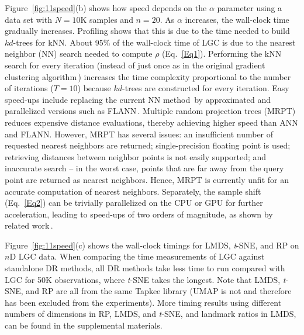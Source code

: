 \documentclass[sagev,Afour,times]{sagej}
\begin{document}
Figure~\ref{fig:11speed}(b) shows how speed depends on the $\alpha$ parameter using a data set with $N=10\mathrm{K}$ samples and $n=20$. As $\alpha$ increases, the wall-clock time gradually increases. Profiling shows that this is due to the time needed to build $kd$-trees for kNN. About 95\% of the wall-clock time of LGC is due to the nearest neighbor (NN) search needed to compute $\rho$ (Eq.~\ref{Eq1}). Performing the kNN search for every iteration (instead of just once as in the original gradient clustering algorithm\,\cite{gc1975}) increases the time complexity proportional to the number of iterations ($T=10$) because $kd$-trees are constructed for every iteration. Easy speed-ups include replacing the current NN method\,\cite{nanoflann} by approximated and parallelized versions such as FLANN\,\cite{flann_2009,flann_2014}.
Multiple random projection trees (MRPT)\,\cite{mrpt:mrpt, mrpt:autoParamTuning} reduces expensive distance evaluations, thereby achieving higher speed than ANN and FLANN. However, MRPT has several issues: an insufficient number of requested nearest neighbors are returned; single-precision floating point is used; retrieving distances between neighbor points is not easily supported; and inaccurate search -- in the worst case, points that are far away from the query point are returned as nearest neighbors. Hence, MRPT is currently unfit for an accurate computation of nearest neighbors. Separately, the sample shift (Eq.~\ref{Eq2}) can be trivially parallelized on the CPU or GPU for further acceleration, leading to speed-ups of two orders of magnitude, as shown by related work\,\cite{cubu}.

Figure~\ref{fig:11speed}(c) shows the wall-clock timings for LMDS, \emph{t}-SNE, and RP on $n$D LGC data. When comparing the time measurements of LGC against standalone DR methods, all DR methods take less time to run compared with LGC for 50$\mathrm{K}$ observations, where \emph{t}-SNE takes the longest. Note that LMDS, \emph{t}-SNE, and RP are all from the same Tapkee library (UMAP is not and therefore has been excluded from the experiments). More timing results using different numbers of dimensions in RP, LMDS, and \emph{t}-SNE, and landmark ratios in LMDS, can be found in the supplemental materials.

\end{document}
